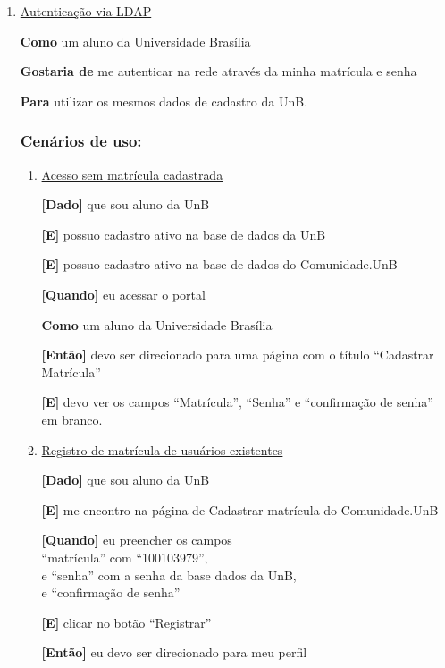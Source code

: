 \begin{enumerate}
\item \underline{Autenticação via LDAP}

\textbf{Como} um aluno da Universidade Brasília

\textbf{Gostaria de} me autenticar na rede através da minha matrícula e senha

\textbf{Para} utilizar os mesmos dados de cadastro da UnB.

\subsubsection*{Cenários de uso:}

\begin{enumerate}
\item \underline{Acesso sem matrícula cadastrada}

\textbf{[Dado]} que sou aluno da UnB

\textbf{[E]} possuo cadastro ativo na base de dados da UnB

\textbf{[E]} possuo cadastro ativo na base de dados do Comunidade.UnB

\textbf{[Quando]} eu acessar o portal

\textbf{Como} um aluno da Universidade Brasília

\textbf{[Então]} devo ser direcionado para uma página com o título ``Cadastrar Matrícula''

\textbf{[E]} devo ver os campos ``Matrícula'', ``Senha'' e
``confirmação de senha'' em branco.

\item \underline{Registro de matrícula de usuários existentes}

\textbf{[Dado]} que sou aluno da UnB

\textbf{[E]} me encontro na página de Cadastrar matrícula do Comunidade.UnB

\textbf{[Quando]} eu preencher os campos \\
``matrícula'' com ``100103979'',\\
e ``senha''  com a senha da base dados da UnB,\\
e ``confirmação de senha''

\textbf{[E]} clicar no botão ``Registrar''

\textbf{[Então]} eu devo ser direcionado para meu perfil
\end{enumerate}
\end{enumerate}

